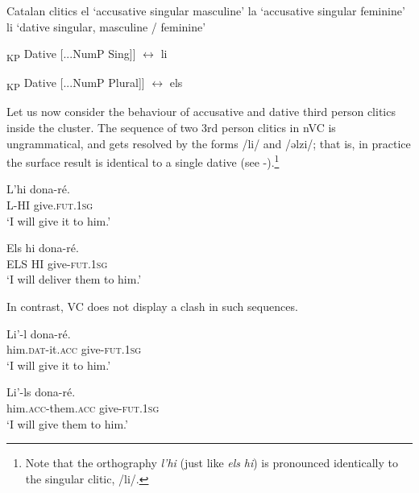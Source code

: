 \documentclass[output=paper,modfonts,nonflat,newtxmath,colorlinks,citecolor=brown]{langsci/langscibook}
\begin{document}
\ea%
	Catalan clitics
    \label{ex:cabre:11}
    \ea el ‘accusative singular masculine’ 
    \ex la ‘accusative singular feminine’
    \ex li ‘dative singular, masculine / feminine’ 
    \z
    \z
    
\ea%
    \label{ex:cabre:12}
   \ea {[}\textsubscript{KP}  Dative [...NumP Sing]{]} $\longleftrightarrow$ li
   
   \ex {[}\textsubscript{KP} Dative   [...NumP Plural]{]} $\longleftrightarrow$ els 
   \z
    \z

Let us now consider the behaviour of accusative and dative third person clitics inside the cluster. The sequence of two 3rd person clitics in nVC is ungrammatical, and gets resolved by the forms /li/ and /ǝlzi/; that is, in practice the surface result is identical to a single dative (see -).\footnote{Note that the orthography \textit{l’hi} (just like \textit{els} \textit{hi}) is pronounced identically to the singular clitic, /li/.} %

\ea
    \label{ex:cabre:13}
    
    \ex 
    \gll L’hi     dona-ré.\\
    L-HI    give.\textsc{fut.1sg}\\
    \glt ‘I will give it to him.’
    \z
    \z

\ea%
    \label{ex:cabre:14}
   
   \ex 
   \gll Els hi  dona-ré.\\
   ELS HI  give-\textsc{fut.1sg}\\
   \glt ‘I will deliver them to him.’
   \z
   \z
 

In contrast, VC does not display a clash in such sequences.

\ea%
    \label{ex:cabre:15}
     \ea
    \gll Li’-l     dona-ré. \\
    	him.\textsc{dat}-it.\textsc{acc} give-\textsc{fut.1sg} \\
    	\glt ‘I will give it to him.’
    
    \ex 
    \gll Li’-ls    dona-ré.\\
    him.\textsc{acc}-them.\textsc{acc} give-\textsc{fut.1sg}  \\
    \glt  ‘I will give them to him.’
    \z
    \z
\end{document}
